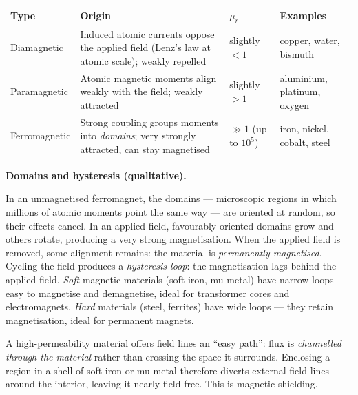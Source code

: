 \documentclass[11pt]{article}
\newcommand{\cle}[1]{{\popxbold\color{popdark}#1}}
\newcounter{popsec}
\newcounter{popsub}
\newcommand{\courssub}[1]{%
  \stepcounter{popsub}%
  \par\vspace{9pt}\noindent{\popxbold\fontsize{11.5}{13}\selectfont\color{popink}{\color{poporange}\thepopsec.\thepopsub}\hspace{6pt}#1}\par\nopagebreak\vspace{4pt}
}
\begin{document}
\begin{center}
\begin{tabularx}{\linewidth}{|l|X|X|X|}
\hline
\rowcolor{popblueL} \textbf{Type} & \textbf{Origin} & \textbf{$\mu_r$} & \textbf{Examples} \\
\hline
Diamagnetic & Induced atomic currents oppose the applied field (Lenz's law at atomic scale); weakly repelled & slightly $< 1$ & copper, water, bismuth \\
\hline
Paramagnetic & Atomic magnetic moments align weakly with the field; weakly attracted & slightly $> 1$ & aluminium, platinum, oxygen \\
\hline
Ferromagnetic & Strong coupling groups moments into \emph{domains}; very strongly attracted, can stay magnetised & $\gg 1$ (up to $10^{5}$) & iron, nickel, cobalt, steel \\
\hline
\end{tabularx}
\end{center}

\textbf{Domains and hysteresis (qualitative).}\par
In an unmagnetised ferromagnet, the \cle{domains} — microscopic regions in which millions of atomic moments point the same way — are oriented at random, so their effects cancel. In an applied field, favourably oriented domains grow and others rotate, producing a very strong magnetisation. When the applied field is removed, some alignment remains: the material is \emph{permanently magnetised}. Cycling the field produces a \emph{hysteresis loop}: the magnetisation lags behind the applied field. \emph{Soft} magnetic materials (soft iron, mu-metal) have narrow loops — easy to magnetise and demagnetise, ideal for transformer cores and electromagnets. \emph{Hard} materials (steel, ferrites) have wide loops — they retain magnetisation, ideal for permanent magnets.

\courssub{Magnetic Shielding}

A high-permeability material offers field lines an ``easy path'': flux is \emph{channelled through the material} rather than crossing the space it surrounds. Enclosing a region in a shell of soft iron or mu-metal therefore diverts external field lines around the interior, leaving it nearly field-free. This is \cle{magnetic shielding}.
\end{document}
